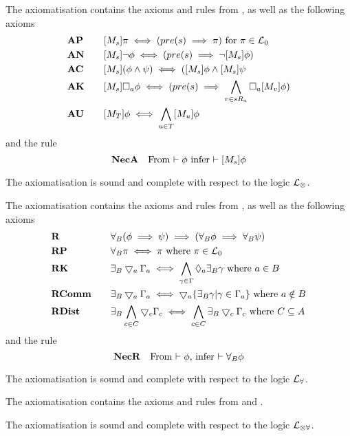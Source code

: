 \begin{defn} \label{axiomAML}
The axiomatisation \AXAML contains the axioms and rules from \AXK, as well as the following axioms
\begin{alignat*}{2}
	& {\bf AP} && \quad [{M_s}]\pi \iff (pre(s) \implies \pi) \text{ for $\pi \in \mathcal{L}_0$}\\
	& {\bf AN} && \quad [{M_s}] \neg \phi \iff (pre(s) \implies \neg [{M_s}] \phi)\\
	& {\bf AC} && \quad [{M_s}](\phi \land \psi) \iff ([{M_s}]\phi \land [{M_s}]\psi\\
	& {\bf AK} && \quad [{M_s}]\Box_a\phi \iff (pre(s) \implies \bigwedge_{v \in s R_a}
		\Box_a [{M_v}] \phi) \\
	& {\bf AU} && \quad [{M_T}] \phi \iff \bigwedge_{u \in T} [{M_u}] \phi
\end{alignat*}
and the rule
\[
	{\bf NecA} \quad \text{From $\vdash \phi$ infer $\vdash [{M_s}] \phi$}
\]
\end{defn}

\begin{lemma} \label{axiomAMLSoundComplete}
The axiomatisation \AXAML is sound and complete with respect to the logic $\mathcal{L}_{\otimes}$.
\end{lemma}

\begin{defn} \label{axiomRML}
The axiomatisation \AXRML contains the axioms and rules from \AXK, as well as the following axioms
\begin{alignat*}{2}
	& {\bf R} && \quad \forall_B (\phi \implies \psi) \implies (\forall_B \phi \implies \forall_B \psi) \\
	& {\bf RP} && \quad \forall_B \pi \iff \pi \text{ where } \pi \in \mathcal{L}_0 \\
	& {\bf RK} && \quad\exists_B \bigtriangledown_a \Gamma_a \iff \bigwedge_{\gamma \in \Gamma} \Diamond_a \exists_B
	\gamma \text{ where } a \in B \\
	& {\bf RComm} && \quad \exists_B \bigtriangledown_a \Gamma_a \iff \bigtriangledown_a \{ \exists_B \gamma | \gamma \in
	\Gamma_a\} \text{ where } a \notin B\\
	& {\bf RDist} && \quad \exists_B \bigwedge_{c \in C} \bigtriangledown_c \Gamma_c \iff \bigwedge_{c \in C}
	\exists_B \bigtriangledown_c \Gamma_c \text{ where } C \subseteq A
\end{alignat*}
and the rule
\[
	{\bf NecR} \quad \text{From $\vdash \phi$, infer $\vdash \forall_B \phi$}
\]
\end{defn}

\begin{lemma} \label{axiomRMLSoundComplete}
The axiomatisation \AXRML is sound and complete with respect to the logic $\mathcal{L}_{\forall}$.
\end{lemma}

\begin{defn} \label{axiomAAML}
The axiomatisation \AXAAML contains the axioms and rules from \AXRML and \AXAML.
\end{defn}

\begin{thm} \label{axiomAAMLSoundComplete}
The axiomatisation \AXAAML is sound and complete with respect to the logic $\mathcal{L}_{\otimes\forall}$.
\end{thm}
